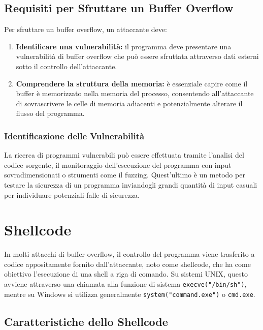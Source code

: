 \subsection{Requisiti per Sfruttare un Buffer Overflow}

Per sfruttare un buffer overflow, un attaccante deve:

\begin{enumerate}
    \item \textbf{Identificare una vulnerabilità:} il programma deve presentare una vulnerabilità di buffer overflow che può essere sfruttata attraverso dati esterni sotto il controllo dell'attaccante.
    
    \item \textbf{Comprendere la struttura della memoria:} è essenziale capire come il buffer è memorizzato nella memoria del processo, consentendo all'attaccante di sovrascrivere le celle di memoria adiacenti e potenzialmente alterare il flusso del programma.
\end{enumerate}

\subsubsection{Identificazione delle Vulnerabilità}

La ricerca di programmi vulnerabili può essere effettuata tramite l'analisi del codice sorgente, il monitoraggio dell'esecuzione del programma con input sovradimensionati o strumenti come il fuzzing. Quest'ultimo è un metodo per testare la sicurezza di un programma inviandogli grandi quantità di input casuali per individuare potenziali falle di sicurezza.

\section{Shellcode}

In molti attacchi di buffer overflow, il controllo del programma viene trasferito a codice appositamente fornito dall'attaccante, noto come shellcode, che ha come obiettivo l'esecuzione di una shell a riga di comando. Su sistemi UNIX, questo avviene attraverso una chiamata alla funzione di sistema \texttt{execve("/bin/sh")}, mentre su Windows si utilizza generalmente \texttt{system("command.exe")} o \texttt{cmd.exe}.

\subsection{Caratteristiche dello Shellcode}

